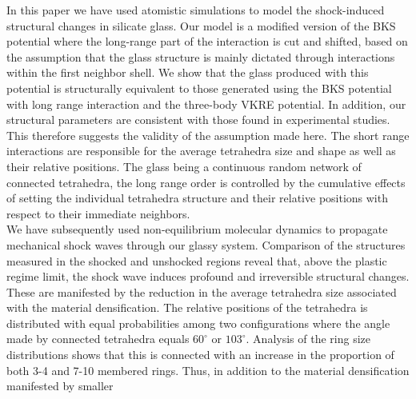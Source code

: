 \documentclass[aps,10pt,twocolumn]{revtex4}
\begin{document}
In this paper we have used atomistic simulations to model the shock-induced structural changes in silicate glass.
Our model is a modified version of the BKS potential where the long-range part of the
interaction is cut and shifted, based on the assumption that the glass structure
is mainly dictated through interactions within the first neighbor shell. We show that the glass
produced with this potential is structurally equivalent to those generated using the BKS
potential with long range interaction and the three-body VKRE potential. In addition, our 
structural parameters are consistent with those found in experimental studies. This
therefore suggests the validity of the assumption made here. The short range interactions are
responsible for the average tetrahedra size and shape as well as their relative positions. The
glass being a continuous random network of connected tetrahedra, the long range order is
controlled by the cumulative effects of setting the individual tetrahedra structure and their
relative positions with respect to their immediate neighbors.\\
We have subsequently used non-equilibrium molecular dynamics to propagate mechanical
shock waves through our glassy system. Comparison of the structures measured in the shocked and
unshocked regions reveal that, above the plastic regime limit, the shock wave induces
profound and irreversible structural changes. These are manifested by the reduction
in the average tetrahedra size associated with the material densification. The relative
positions of the tetrahedra is distributed with equal probabilities among two configurations
where the angle made by connected tetrahedra equals $60^\circ$ or $103^\circ$. Analysis of the ring size
distributions shows that this is connected with an increase in the proportion of both 3-4 and
7-10 membered rings. Thus, in addition to the material densification manifested by smaller
\end{document}

